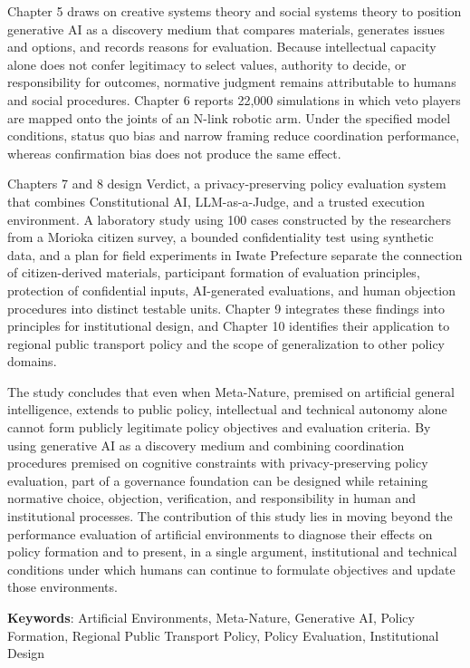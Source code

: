 Chapter 5 draws on creative systems theory and social systems theory to position generative AI as a discovery medium that compares materials, generates issues and options, and records reasons for evaluation. Because intellectual capacity alone does not confer legitimacy to select values, authority to decide, or responsibility for outcomes, normative judgment remains attributable to humans and social procedures. Chapter 6 reports 22,000 simulations in which veto players are mapped onto the joints of an N-link robotic arm. Under the specified model conditions, status quo bias and narrow framing reduce coordination performance, whereas confirmation bias does not produce the same effect.

Chapters 7 and 8 design Verdict, a privacy-preserving policy evaluation system that combines Constitutional AI, LLM-as-a-Judge, and a trusted execution environment. A laboratory study using 100 cases constructed by the researchers from a Morioka citizen survey, a bounded confidentiality test using synthetic data, and a plan for field experiments in Iwate Prefecture separate the connection of citizen-derived materials, participant formation of evaluation principles, protection of confidential inputs, AI-generated evaluations, and human objection procedures into distinct testable units. Chapter 9 integrates these findings into principles for institutional design, and Chapter 10 identifies their application to regional public transport policy and the scope of generalization to other policy domains.

The study concludes that even when Meta-Nature, premised on artificial general intelligence, extends to public policy, intellectual and technical autonomy alone cannot form publicly legitimate policy objectives and evaluation criteria. By using generative AI as a discovery medium and combining coordination procedures premised on cognitive constraints with privacy-preserving policy evaluation, part of a governance foundation can be designed while retaining normative choice, objection, verification, and responsibility in human and institutional processes. The contribution of this study lies in moving beyond the performance evaluation of artificial environments to diagnose their effects on policy formation and to present, in a single argument, institutional and technical conditions under which humans can continue to formulate objectives and update those environments.

\vspace{1cm}
\noindent
\textbf{Keywords}: Artificial Environments, Meta-Nature, Generative AI, Policy Formation, Regional Public Transport Policy, Policy Evaluation, Institutional Design

